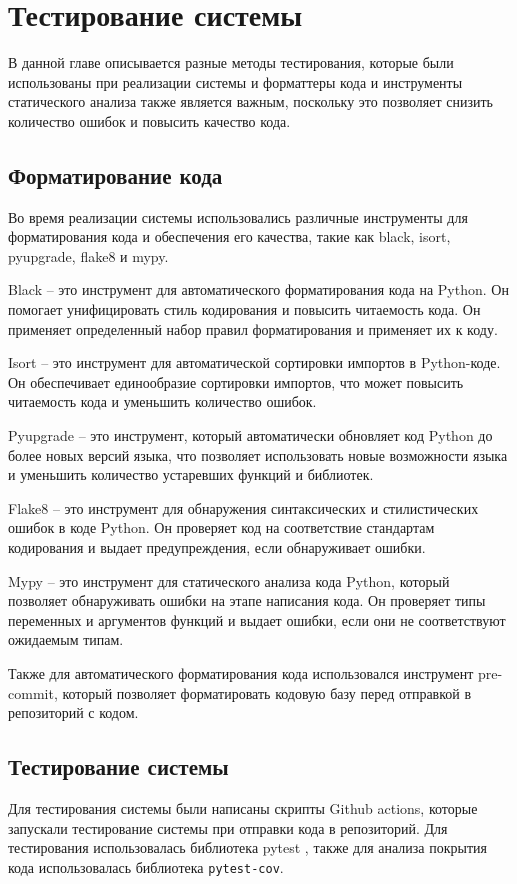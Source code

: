 \documentclass[PI, VKR]{HSEUniversity}
\begin{document}
\chapter{Тестирование системы}
\label{sec:orgb168760}
В данной главе описывается разные методы тестирования, которые были использованы при реализации системы и форматтеры кода и инструменты статического анализа также является важным, поскольку это позволяет снизить количество ошибок и повысить качество кода.
\section{Форматирование кода}
\label{sec:org66d5310}
Во время реализации системы использовались различные инструменты для форматирования кода и обеспечения его качества, такие как black, isort, pyupgrade, flake8 и mypy.

Black -- это инструмент для автоматического форматирования кода на Python. Он помогает унифицировать стиль кодирования и повысить читаемость кода. Он применяет определенный набор правил форматирования и применяет их к коду.

Isort -- это инструмент для автоматической сортировки импортов в Python-коде. Он обеспечивает единообразие сортировки импортов, что может повысить читаемость кода и уменьшить количество ошибок.

Pyupgrade -- это инструмент, который автоматически обновляет код Python до более новых версий языка, что позволяет использовать новые возможности языка и уменьшить количество устаревших функций и библиотек.

Flake8 -- это инструмент для обнаружения синтаксических и стилистических ошибок в коде Python. Он проверяет код на соответствие стандартам кодирования и выдает предупреждения, если обнаруживает ошибки.

Mypy -- это инструмент для статического анализа кода Python, который позволяет обнаруживать ошибки на этапе написания кода. Он проверяет типы переменных и аргументов функций и выдает ошибки, если они не соответствуют ожидаемым типам.

Также для автоматического форматирования кода использовался инструмент pre-commit, который позволяет форматировать кодовую базу перед отправкой в репозиторий с кодом.
\section{Тестирование системы}
\label{sec:org0bce520}
Для тестирования системы были написаны скрипты Github actions, которые запускали тестирование системы при отправки кода в репозиторий. Для тестирования использовалась библиотека pytest \autocite{krekel_pytest_2004}, также для анализа покрытия кода использовалась библиотека \texttt{pytest-cov}.
\end{document}
